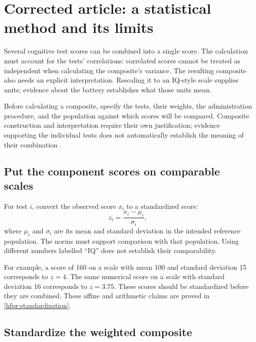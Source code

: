 \chapter{Corrected article: a statistical method and its limits}
\label{sec:replacement}

Several cognitive test scores can be combined into a single score. The
calculation must account for the tests' correlations: correlated scores
cannot be treated as independent when calculating the composite's variance.
The resulting composite also needs an explicit interpretation. Rescaling it
to an IQ-style scale supplies units; evidence about the battery establishes
what those units mean.

Before calculating a composite, specify the tests, their weights, the
administration procedure, and the population against which scores will be
compared. Composite construction and interpretation require their own
justification; evidence supporting the individual tests does not
automatically establish the meaning of their combination
\citep[Standard~1.14]{standards2014}.

\section{Put the component scores on comparable scales}

For test \(i\), convert the observed score \(x_i\) to a standardized score:
\begin{equation}
  z_i=\frac{x_i-\mu_i}{\sigma_i},
  \label{eq:standardize}
\end{equation}
where \(\mu_i\) and \(\sigma_i\) are its mean and standard deviation in the
intended reference population. The norms must support comparison with that
population. Using different numbers labelled ``IQ'' does not establish
their comparability.

For example, a score of 160 on a scale with mean 100 and standard deviation
15 corresponds to \(z=4\). The same numerical score on a scale with standard
deviation 16 corresponds to \(z=3.75\). These scores should be standardized
before they are combined.
These affine and arithmetic claims are proved in
\cref{hfpr:standardization}.

\section{Standardize the weighted composite}

